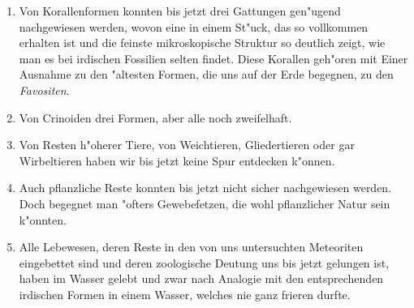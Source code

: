 \documentclass[a4paper, 11pt, oneside]{article}
\begin{document}
\begin{enumerate}
\item Von Korallenformen konnten bis jetzt drei Gattungen gen"ugend nachgewiesen werden, wovon eine in einem St"uck, das so vollkommen erhalten ist und die feinste mikroskopische Struktur so deutlich zeigt, wie man es bei irdischen Fossilien selten findet. Diese Korallen geh"oren mit Einer Ausnahme zu den "altesten Formen, die uns auf der Erde begegnen, zu den \emph{Favositen}.
\item Von Crinoiden drei Formen, aber alle noch zweifelhaft.
\item Von Resten h"oherer Tiere, von Weichtieren, Gliedertieren oder gar Wirbeltieren haben wir bis jetzt keine Spur entdecken k"onnen.
\item Auch pflanzliche Reste konnten bis jetzt nicht sicher nachgewiesen werden. Doch begegnet man "ofters Gewebefetzen, die wohl pflanzlicher Natur sein k"onnten.
\item Alle Lebewesen, deren Reste in den von uns untersuchten Meteoriten eingebettet sind und deren zoologische Deutung uns bis jetzt gelungen ist, haben im Wasser gelebt und zwar nach Analogie mit den entsprechenden irdischen Formen in einem Wasser, welches nie ganz frieren durfte.


\end{enumerate}
\end{document}
